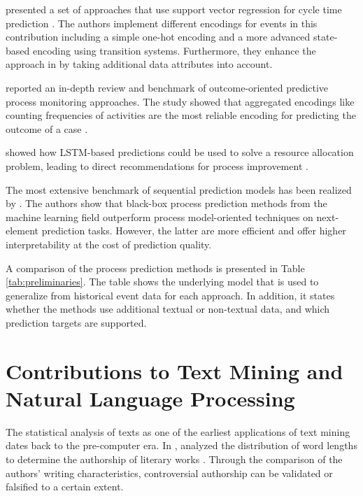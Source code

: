 \citeauthor{DBLP:journals/computing/PolatoSBL18} presented a set of approaches that use support vector regression for cycle time prediction  \cite{DBLP:journals/computing/PolatoSBL18}.
The authors implement different encodings for events in this contribution including a simple one-hot encoding and a more advanced state-based encoding using transition systems.
Furthermore, they enhance the approach in \cite{DBLP:journals/is/AalstSS11} by taking additional data attributes into account.

\citeauthor{DBLP:journals/tkdd/TeinemaaDRM19} reported an in-depth review and benchmark of outcome-oriented predictive process monitoring approaches.
The study showed that aggregated encodings like counting frequencies of activities are the most reliable encoding for predicting the outcome of a case \cite{DBLP:journals/tkdd/TeinemaaDRM19}.

\citeauthor{DBLP:conf/icpm/ParkS19} showed how LSTM-based predictions could be used to solve a resource allocation problem, leading to direct recommendations for process improvement \cite{DBLP:conf/icpm/ParkS19}.

The most extensive benchmark of sequential prediction models has been realized by \citeauthor{DBLP:journals/sosym/TaxTZ20} \cite{DBLP:journals/sosym/TaxTZ20}.
The authors show that black-box process prediction methods from the machine learning field outperform process model-oriented techniques on next-element prediction tasks.
However, the latter are more efficient and offer higher interpretability at the cost of prediction quality.


A comparison of the process prediction methods is presented in Table \ref{tab:preliminaries}.
The table shows the underlying model that is used to generalize from historical event data for each approach.
In addition, it states whether the methods use additional textual or non-textual data, and which prediction targets are supported.

\section{Contributions to Text Mining and Natural Language Processing}

The statistical analysis of texts as one of the earliest applications of text mining dates back to the pre-computer era.
In \citeyear{mendenhall1887characteristic}, \citeauthor{mendenhall1887characteristic} analyzed the distribution of word lengths to determine the authorship of literary works \cite{mendenhall1887characteristic}.
Through the comparison of the authors’ writing characteristics, controversial authorship can be validated or falsified to a certain extent.

